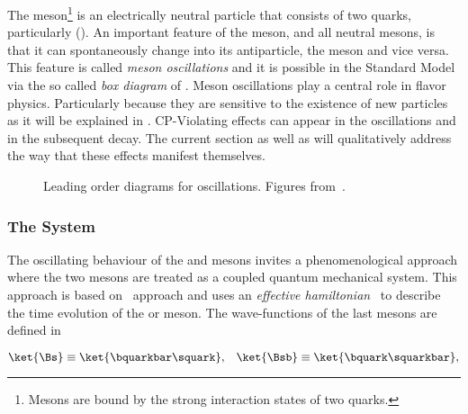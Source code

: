 

The \Bs meson\footnote{Mesons are bound by the strong interaction states of two quarks.} is an electrically neutral
particle that consists of two quarks, particularly (\bquarkbar\squark). An important feature of
the \Bs meson, and all neutral mesons, is that it can spontaneously change into its antiparticle,
the \Bsb meson and vice versa. This feature is called {\it meson oscillations} and it is possible
in the Standard Model via the so called {\it box diagram} of .
Meson oscillations play a central role in flavor physics. Particularly because they are sensitive to the
existence of new particles as it will be explained in . CP-Violating effects can
appear in the \BBbarSyst oscillations and in the subsequent decay. The current section as well
as  will qualitatively address the way that these effects manifest themselves.

\begin{figure}[h]
  \centering
  \begin{subfigure}{0.5\textwidth}
    \centering
    {\sffamily }
    \caption{}
    \label{bs_box_1}
  \end{subfigure}%
  \begin{subfigure}{0.5\textwidth}
    \centering
    {\sffamily }
    \caption{}
    \label{bs_box_2}
  \end{subfigure}
  \caption{Leading order diagrams for \BBbarSyst oscillations. Figures from~\cite{jeroenThesis}.}
  \label{bs_box}
\end{figure}

\subsubsection{The \BBbarSyst System}

The oscillating behaviour of the \Bs and \Bsb mesons invites a phenomenological approach
where the two mesons are treated as a coupled quantum mechanical system. This approach
is based on~\cite{Weisskopf:1930au,Weisskopf:1930ps} approach and uses an {\it effective hamiltonian}~\cite{eff-hamiltonian-bs-syst,DeBruyn-thesis}
to describe the time evolution of the \Bs or \Bsb meson. The wave-functions of the last mesons
are defined in 

\begin{equation}
\ket{\Bs}  \equiv  \ket{\bquarkbar\squark}, \;\;\; \ket{\Bsb} \equiv  \ket{\bquark\squarkbar},
\label{bs_wavefunctions}
\end{equation}

